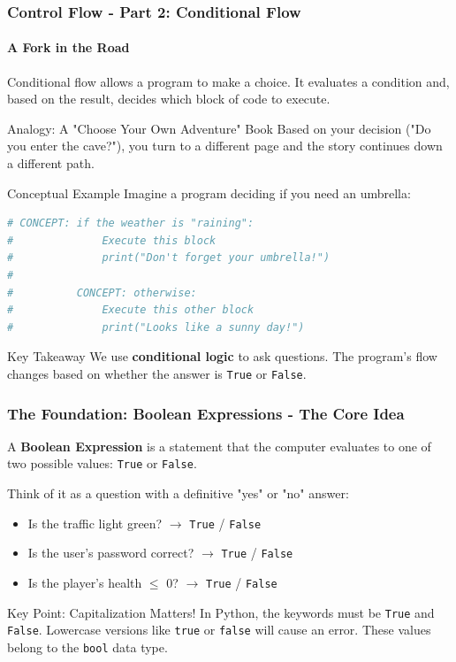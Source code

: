 \documentclass{beamer}
\begin{document}
\begin{frame}[fragile]
    \frametitle{Control Flow - Part 2: Conditional Flow}
    \framesubtitle{A Fork in the Road}
    
    Conditional flow allows a program to make a choice. It evaluates a condition and, based on the result, decides which block of code to execute.
    
    \begin{block}{Analogy: A "Choose Your Own Adventure" Book}
        Based on your decision ("Do you enter the cave?"), you turn to a different page and the story continues down a different path.
    \end{block}
    
    \begin{exampleblock}{Conceptual Example}
        Imagine a program deciding if you need an umbrella:
        \begin{lstlisting}[language=Python]
# CONCEPT: if the weather is "raining":
#              Execute this block
#              print("Don't forget your umbrella!")
#
#          CONCEPT: otherwise:
#              Execute this other block
#              print("Looks like a sunny day!")
        \end{lstlisting}
    \end{exampleblock}
    
    \begin{alertblock}{Key Takeaway}
        We use \textbf{conditional logic} to ask questions. The program's flow changes based on whether the answer is \texttt{True} or \texttt{False}.
    \end{alertblock}
\end{frame}

\begin{frame}[fragile]
    \frametitle{The Foundation: Boolean Expressions - The Core Idea}
    
    A \textbf{Boolean Expression} is a statement that the computer evaluates to one of two possible values: \texttt{True} or \texttt{False}.
    
    \vfill
    
    Think of it as a question with a definitive "yes" or "no" answer:
    \begin{itemize}
        \item Is the traffic light green? $\rightarrow$ \texttt{True} / \texttt{False}
        \item Is the user's password correct? $\rightarrow$ \texttt{True} / \texttt{False}
        \item Is the player's health $\le$ 0? $\rightarrow$ \texttt{True} / \texttt{False}
    \end{itemize}
    
    \vfill
    
    \begin{alertblock}{Key Point: Capitalization Matters!}
        In Python, the keywords must be \texttt{True} and \texttt{False}. Lowercase versions like \texttt{true} or \texttt{false} will cause an error. These values belong to the \texttt{bool} data type.
    \end{alertblock}
    
\end{frame}
\end{document}
